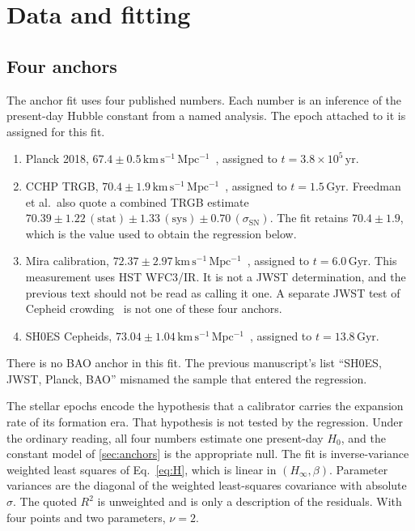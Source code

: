 \section{Data and fitting}
\label{sec:methods}

\subsection{Four anchors}
\label{sec:anchor-data}

The anchor fit uses four published numbers.
Each number is an inference of the present-day Hubble constant from a named analysis.
The epoch attached to it is assigned for this fit.
\begin{enumerate}[leftmargin=1.4em]
  \item Planck 2018, $67.4\pm0.5\,\mathrm{km\,s^{-1}\,Mpc^{-1}}$~\citep{Planck2018VI}, assigned to $t=3.8\times10^{5}\,\mathrm{yr}$.
  \item CCHP TRGB, $70.4\pm1.9\,\mathrm{km\,s^{-1}\,Mpc^{-1}}$~\citep{Freedman2025}, assigned to $t=1.5\,\mathrm{Gyr}$.
        Freedman et al.\ also quote a combined TRGB estimate $70.39\pm1.22\,(\mathrm{stat})\pm1.33\,(\mathrm{sys})\pm0.70\,(\sigma_{\mathrm{SN}})$.
        The fit retains $70.4\pm1.9$, which is the value used to obtain the regression below.
  \item Mira calibration, $72.37\pm2.97\,\mathrm{km\,s^{-1}\,Mpc^{-1}}$~\citep{Huang2024Miras}, assigned to $t=6.0\,\mathrm{Gyr}$.
        This measurement uses HST WFC3/IR.
        It is not a JWST determination, and the previous text should not be read as calling it one.
        A separate JWST test of Cepheid crowding~\citep{RiessJWST2024} is not one of these four anchors.
  \item SH0ES Cepheids, $73.04\pm1.04\,\mathrm{km\,s^{-1}\,Mpc^{-1}}$~\citep{RiessSH0ES2022}, assigned to $t=13.8\,\mathrm{Gyr}$.
\end{enumerate}
There is no BAO anchor in this fit.
The previous manuscript's list ``SH0ES, JWST, Planck, BAO'' misnamed the sample that entered the regression.

The stellar epochs encode the hypothesis that a calibrator carries the expansion rate of its formation era.
That hypothesis is not tested by the regression.
Under the ordinary reading, all four numbers estimate one present-day $H_{0}$, and the constant model of \cref{sec:anchors} is the appropriate null.
The fit is inverse-variance weighted least squares of Eq.~\eqref{eq:H}, which is linear in $(H_{\infty},\beta)$.
Parameter variances are the diagonal of the weighted least-squares covariance with absolute $\sigma$.
The quoted $R^{2}$ is unweighted and is only a description of the residuals.
With four points and two parameters, $\nu=2$.

